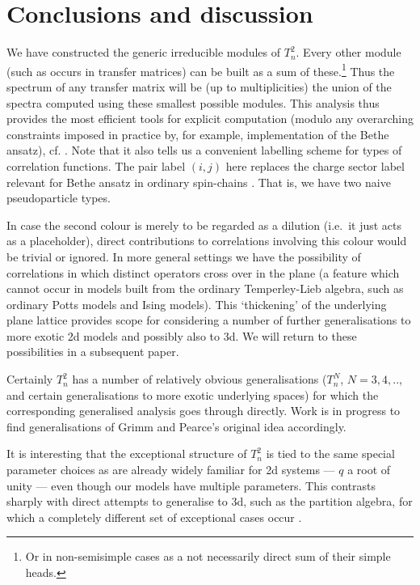 \documentclass[12pt]{iopart}
\begin{document}
\section{Conclusions and discussion}
\setcounter{paragraph}{0}

We have constructed the generic irreducible modules of $T^2_n$.  Every
other module (such as occurs in transfer matrices) can be built as a
sum of these.\footnote{ Or in non-semisimple cases as a not
necessarily direct sum of their simple heads.}  Thus the spectrum of
any transfer matrix will be (up to multiplicities) the union of the
spectra computed using these smallest possible modules.  This analysis
thus provides the most efficient tools for explicit computation
(modulo any overarching constraints imposed in practice by, for
example, implementation of the Bethe ansatz),
cf. \cite[\S12.4]{Baxter}.  Note that it also tells us a convenient
labelling scheme for types of correlation functions.  The pair label
$(i,j)$ here replaces the charge sector label relevant for Bethe
ansatz in ordinary spin-chains \cite[\S8.4]{Baxter}.  That is, we
have two naive pseudoparticle types.

In case the second colour is merely to be regarded as a dilution
(i.e.\ it just acts as a placeholder), direct contributions to
correlations involving this colour would be trivial or ignored.  In
more general settings we have the possibility of correlations in which
distinct operators cross over in the plane (a feature which cannot
occur in models built from the ordinary Temperley-Lieb algebra, such
as ordinary Potts models and Ising models).  This `thickening' of the
underlying plane lattice provides scope for considering a number of
further generalisations to more exotic 2d models and possibly also to
3d. We will return to these possibilities in a subsequent paper.

Certainly $T^2_n$ has a number of relatively obvious generalisations
($T^N_n$, $N=3,4,..$, and certain generalisations to more exotic
underlying spaces) for which the corresponding generalised analysis
goes through directly.  Work is in progress to find generalisations of
Grimm and Pearce's original idea accordingly.

It is interesting that the exceptional structure of $T^2_n$ is tied to
the same special parameter choices as are already widely familiar for
2d systems --- $q$ a root of unity --- even though our models have
multiple parameters.  This contrasts sharply with direct attempts to
generalise to 3d, such as the partition algebra, for which a
completely different set of exceptional cases occur \cite{M96}.
\end{document}
